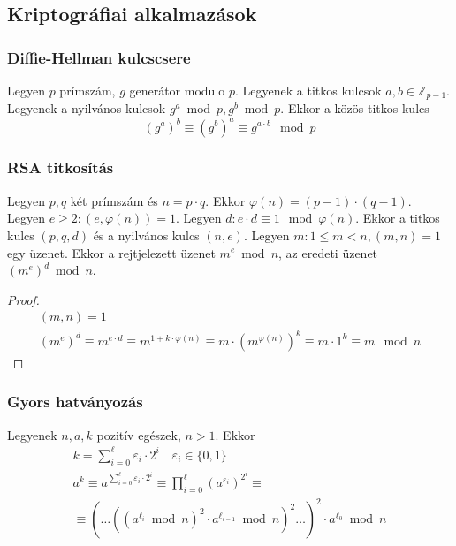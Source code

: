 \setcounter{definition}{0}
\setcounter{theorem}{0}
\subsection{Kriptográfiai alkalmazások}
\subsubsection{Diffie-Hellman kulcscsere}
\begin{definition}
	Legyen $p$ prímszám, $g$ generátor modulo $p$.
	Legyenek a titkos kulcsok $a, b \in \mathbb{Z}_{p - 1}$.
	Legyenek a nyilvános kulcsok $g^a \bmod p, g^b \bmod p$.
	Ekkor a közös titkos kulcs
	\begin{equation*}
		(g^a)^b \equiv (g^b)^a \equiv g^{a \cdot b} \mod p
	\end{equation*}
\end{definition}
\subsubsection{RSA titkosítás}
\begin{definition}
	Legyen $p, q$ két prímszám és $n = p \cdot q$.
	Ekkor $\varphi(n) = (p - 1) \cdot (q - 1)$.
	Legyen $e \geq 2: (e, \varphi(n)) = 1$.
	Legyen $d: e \cdot d \equiv 1 \mod \varphi(n)$.
	Ekkor a titkos kulcs $(p, q, d)$ és a nyilvános kulcs $(n, e)$.
	Legyen $m: 1 \leq m < n, (m, n) = 1$ egy üzenet.
	Ekkor a rejtjelezett üzenet $m^e \bmod n$,
	az eredeti üzenet $(m^e)^d \bmod n$.
\end{definition}
\begin{proof}
	\begin{gather*}
		(m, n) = 1 \\
		(m^e)^d \equiv m^{e \cdot d} \equiv m^{1 + k \cdot \varphi(n)} \equiv
		m \cdot (m^{\varphi(n)})^k \equiv m \cdot 1^k \equiv m \mod n
	\end{gather*}
\end{proof}
\subsubsection{Gyors hatványozás}
\begin{theorem}
	Legyenek $n, a, k$ pozitív egészek, $n > 1$. Ekkor
	\begin{gather*}
		k = \sum_{i = 0}^{\ell} \varepsilon_i \cdot 2^i
		\quad \varepsilon_i \in \{ 0, 1 \} \\
		a^k \equiv a^{\sum_{i = 0}^{\ell} \varepsilon_i \cdot 2^i} \equiv
		\prod_{i = 0}^{\ell} \left( a^{\varepsilon_i} \right)^{2^i} \equiv \\
		\equiv \left(\dots \left(\left( a^{\ell_i} \bmod n \right)^2 \cdot
		a^{\ell_{i - 1}} \bmod n \right)^2 \dots \right)^2 \cdot
		a^{\ell_0} \bmod n
	\end{gather*}
\end{theorem}
